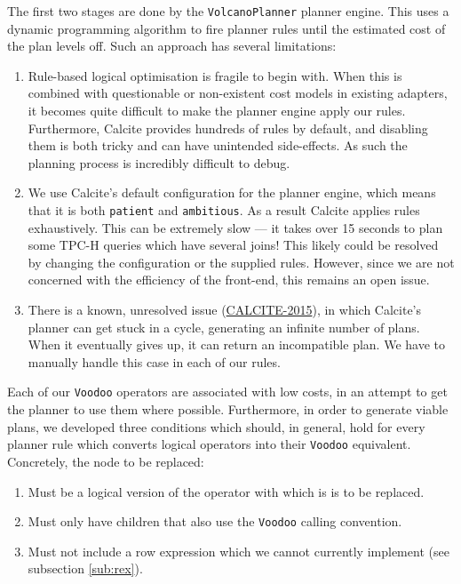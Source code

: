 \begin{enumerate}
\begin{enumerate}
    \end{enumerate}
\end{enumerate}

The first two stages are done by the \texttt{VolcanoPlanner} planner engine. This uses a dynamic programming algorithm to fire planner rules until the estimated cost of the plan levels off. Such an approach has several limitations:
\begin{enumerate}
    \item Rule-based logical optimisation is fragile to begin with. When this is combined with questionable or non-existent cost models in existing adapters, it becomes quite difficult to make the planner engine apply our rules. Furthermore, Calcite provides hundreds of rules by default, and disabling them is both tricky and can have unintended side-effects. As such the planning process is incredibly difficult to debug.
    \item We use Calcite's default configuration for the planner engine, which means that it is both \texttt{patient} and \texttt{ambitious}. As a result Calcite applies rules exhaustively. This can be extremely slow — it takes over 15 seconds to plan some TPC-H queries which have several joins! This likely could be resolved by changing the configuration or the supplied rules. However, since we are not concerned with the efficiency of the front-end, this remains an open issue.
    \item There is a known, unresolved issue (\hyperlink{https://jira.apache.org/jira/browse/CALCITE-2015}{CALCITE-2015}), in which Calcite's planner can get stuck in a cycle, generating an infinite number of plans. When it eventually gives up, it can return an incompatible plan. We have to manually handle this case in each of our rules.
\end{enumerate}

Each of our \texttt{Voodoo} operators are associated with low costs, in an attempt to get the planner to use them where possible. Furthermore, in order to generate viable plans, we developed three conditions which should, in general, hold for every planner rule which converts logical operators into their \texttt{Voodoo} equivalent. Concretely, the node to be replaced:
\begin{enumerate}
    \item Must be a logical version of the operator with which is is to be replaced.
    \item Must only have children that also use the \texttt{Voodoo} calling convention.
    \item Must not include a row expression which we cannot currently implement (see subsection \ref{sub:rex}).
\end{enumerate}

